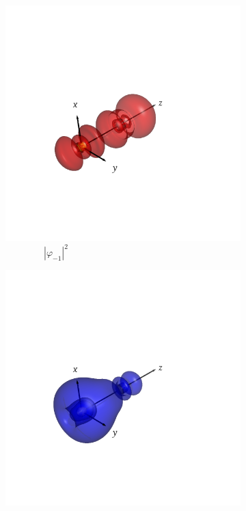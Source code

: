 \documentclass[journal=inoraj,manuscript=article]{achemso}
\begin{document}
\begin{figure}[!h]
    \vspace{0.0cm}
    \begin{subfigure}[t]{0.32\textwidth}
        \centering
        \includegraphics[width=\linewidth]{./AuCn+/nocv-1.png} 
        \caption*{\ \ \ \ \ \ \ \ $|\varphi_{-1}|^2$} 
    \end{subfigure}
    \hfill
    \begin{subfigure}[t]{0.32\textwidth}
        \centering
        \includegraphics[width=\linewidth]{./AuCn+/nocv+1.png} 

\end{subfigure}
\end{figure}
\end{document}
